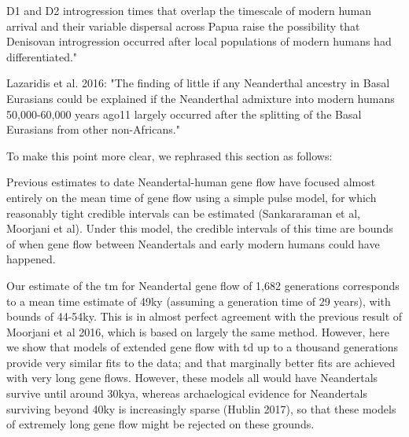 \documentclass[11pt]{article}
\begin{document}
D1 and D2 introgression times that overlap the timescale of modern human arrival and their variable dispersal across Papua raise the possibility that Denisovan introgression occurred after local populations of modern humans had differentiated."

Lazaridis et al. 2016: "The finding of little if any Neanderthal ancestry in Basal Eurasians could be explained if the Neanderthal admixture into modern humans 50,000-60,000 years ago11 largely occurred after the splitting of the Basal Eurasians from other non-Africans."

To make this point more clear, we rephrased this section as follows:

\begin{mdframed}[hidealllines=true,backgroundcolor=grey!20]
Previous estimates to date Neandertal-human gene flow have focused almost entirely on the mean time of gene flow using a simple pulse model, for which reasonably tight credible intervals can be estimated (Sankararaman et al, Moorjani et al). Under this model, the credible intervals of this time are bounds of when gene flow between Neandertals and early modern humans could have happened. 

Our estimate of the tm for Neandertal gene flow of 1,682 generations corresponds to a mean time estimate of 49ky (assuming a generation time of 29 years), with bounds of 44-54ky. This is in almost perfect agreement with the previous result of Moorjani et al 2016, which is based on largely the same method. However, here we show that models of extended gene flow with td up to a thousand generations provide very similar fits to the data; and that marginally better fits are achieved with very long gene flows. However, these models all would have Neandertals survive until around 30kya, whereas archaelogical evidence for Neandertals surviving beyond 40ky is increasingly sparse (Hublin 2017), so that these models of extremely long gene flow might be rejected on these grounds. 
\end{mdframed}
\end{document}
